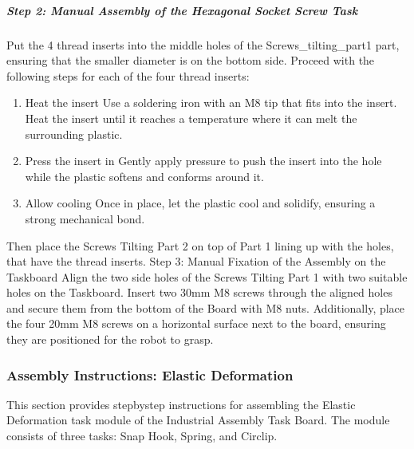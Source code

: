 \documentclass[letterpaper,10pt,english]{sphinxmanual}
\let\sphinxpxdimen\pdfpxdimen\else\newdimen\sphinxpxdimen
\begin{document}
\subparagraph{Step 2: Manual Assembly of the Hexagonal Socket Screw Task}
\label{\detokenize{4-Assembly-Instructions-Screws-and-Nuts:id4}}
\sphinxAtStartPar
Put the 4 thread inserts into the middle holes of the Screws\_tilting\_part1 part, ensuring that the smaller diameter is on the bottom side.
Proceed with the following steps for each of the four thread inserts:
\begin{enumerate}
%
\item {} 
\sphinxAtStartPar
Heat the insert \textendash{} Use a soldering iron with an M8 tip that fits into the insert. Heat the insert until it reaches a temperature where it can melt the surrounding plastic.

\item {} 
\sphinxAtStartPar
Press the insert in \textendash{} Gently apply pressure to push the insert into the hole while the plastic softens and conforms around it.

\item {} 
\sphinxAtStartPar
Allow cooling \textendash{} Once in place, let the plastic cool and solidify, ensuring a strong mechanical bond.

\end{enumerate}

\sphinxAtStartPar
Then place the Screws Tilting Part 2 on top of Part 1 lining up with the holes, that have the thread inserts. Step 3: Manual Fixation of the Assembly on the Taskboard Align the two side holes of the Screws Tilting Part 1 with two suitable holes on the Taskboard. Insert two 30mm M8 screws through the aligned holes and secure them from the bottom of the Board with M8 nuts.
Additionally, place the four 20mm M8 screws on a horizontal surface next to the board, ensuring they are positioned for the robot to grasp.

\noindent{\hspace*{\fill}\sphinxincludegraphics[width=400\sphinxpxdimen]{{screws_tilting_assembly}.png}\hspace*{\fill}}

\sphinxstepscope


\subsubsection{Assembly Instructions: Elastic Deformation}
\label{\detokenize{5-Assembly-Instructions-Elastic-Deformation:assembly-instructions-elastic-deformation}}\label{\detokenize{5-Assembly-Instructions-Elastic-Deformation::doc}}
\sphinxAtStartPar
This section provides step\sphinxhyphen{}by\sphinxhyphen{}step instructions for assembling the Elastic Deformation task module of the Industrial Assembly Task Board.
The module consists of three tasks: Snap Hook, Spring, and Circlip.
\end{document}

